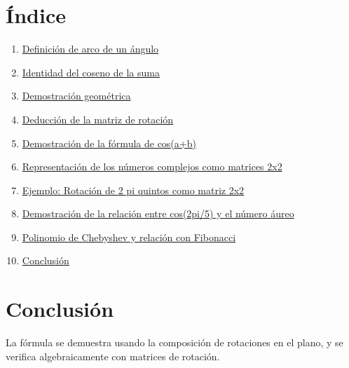 \documentclass{article}
\begin{document}
\section*{Índice}
\begin{enumerate}
  \item \hyperref[sec:arco]{Definición de arco de un ángulo}
  \item \hyperref[sec:identidad]{Identidad del coseno de la suma}
  \item \hyperref[sec:geom]{Demostración geométrica}
  \item \hyperref[sec:rotacion]{Deducción de la matriz de rotación}
  \item \hyperref[sec:demcos]{Demostración de la fórmula de cos(a+b)}
  \item \hyperref[sec:complejos]{Representación de los números complejos como matrices 2x2}
  \item \hyperref[sec:ejemplo]{Ejemplo: Rotación de 2 pi quintos como matriz 2x2}
  \item \hyperref[sec:cosenoaureo]{Demostración de la relación entre cos(2pi/5) y el número áureo}
  \item \hyperref[sec:chebfib]{Polinomio de Chebyshev y relación con Fibonacci}
  \item \hyperref[sec:conclusion]{Conclusión}
\end{enumerate}


\pagecolor{carne}

\newpage

\pagecolor{white}

\newpage

\pagecolor{carne}

\newpage

\pagecolor{white}

\newpage

\pagecolor{carne}

\newpage

\pagecolor{white}

\newpage

\pagecolor{carne}

\newpage

\pagecolor{white}

\newpage

\pagecolor{carne}

\newpage

\pagecolor{white}
\section{Conclusión}\label{sec:conclusion}
La fórmula se demuestra usando la composición de rotaciones en el plano, y se verifica algebraicamente con matrices de rotación.
\end{document}
